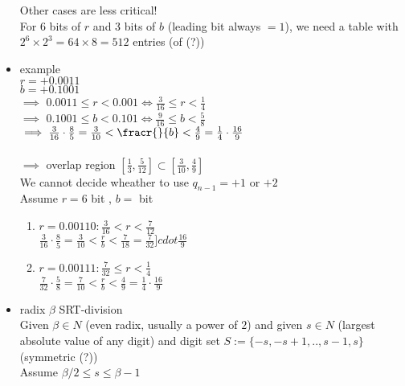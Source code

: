 \begin{itemize}
    Other cases are less critical! \\
    For $6$ bits of $r$ and $3$ bits of $b$ (leading bit always $=1$), we need a table with $2^6\times 2^3=64\times 8=512$ entries (of (?))\\
   
    \item example \\
    $r=+0.0011$ \\
    $b=+0.1001$ \\
    $\implies$ $0.0011\le r< 0.001 \iff \frac{3}{16}\le r< \frac{1}{4}$ \\
    $\implies$ $0.1001\le b< 0.101 \iff \frac{9}{16}\le b< \frac{5}{8}$ \\
   
    $\implies \frac{3}{16}\cdot \frac{8}{5}=\frac{3}{10}< \fracr{}{b}<\frac{4}{9}=\frac{1}{4}\cdot \frac{16}{9}$ \\
   
    \\
    $\implies $ overlap region $[\frac{1}{3}, \frac{5}{12}]\subset [\frac{3}{10}, \frac{4}{9}]$ \\
   
    We cannot decide wheather to use $q_{n-1}=+1$ or $+2$ \\
   
    Assume $r=6$ bit , $b=$ bit \\
    \begin{enumerate}
        \item $r=0.00110: \frac{3}{16}<r<\frac{7}{12}$ \\
        $\frac{3}{16}\cdot \frac{8}{5}=\frac{3}{10}<\frac{r}{b}<\frac{7}{18}=\frac{7}{32}]cdot \frac{16}{9}$
        \item $r=0.00111: \frac{7}{32}\le r<\frac{1}{4}$ \\
        $\frac{7}{32}\cdot \frac{5}{8}=\frac{7}{10}<\frac{r}{b}<\frac{4}{9}=\frac{1}{4}\cdot \frac{16}{9}$  
    \end{enumerate}
    \item radix $\beta$ SRT-division \\
    Given $\beta\in N$ (even radix, usually a power of $2$) and given $s\in N$ (largest absolute value of any digit) and digit set $S:=\{-s,-s+1,..,s-1,s\}$ (symmetric (?)) \\
   
    Assume $\beta/2\le s\le \beta-1$ \\
   

\end{itemize}
